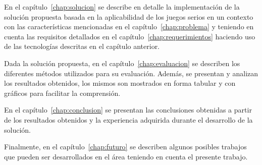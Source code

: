 En el capítulo~\ref{chap:solucion} se describe en detalle la implementación de la solución propuesta
basada en la aplicabilidad de los juegos serios en un contexto con las
características mencionadas en el capítulo~\ref{chap:problema} y teniendo en
cuenta las requisitos detallados en el capítulo~\ref{chap:requerimientos}
haciendo uso de las tecnologías descritas en el capítulo anterior. 


Dada la solución propuesta, en el capítulo~\ref{chap:evaluacion} se describen 
los diferentes métodos utilizados para su evaluación. Además, se presentan y analizan los 
resultados obtenidos, los mismos son mostrados en forma tabular y con gráficos para facilitar la comprensión.




 


En el capítulo~\ref{chap:conclusion} se presentan las conclusiones obtenidas a
partir de los resultados obtenidos y la experiencia adquirida durante el
desarrollo de la solución.


Finalmente, en el capítulo~\ref{chap:futuro} se describen algunos posibles trabajos
que pueden ser desarrollados en el área teniendo en cuenta el presente
trabajo. 

